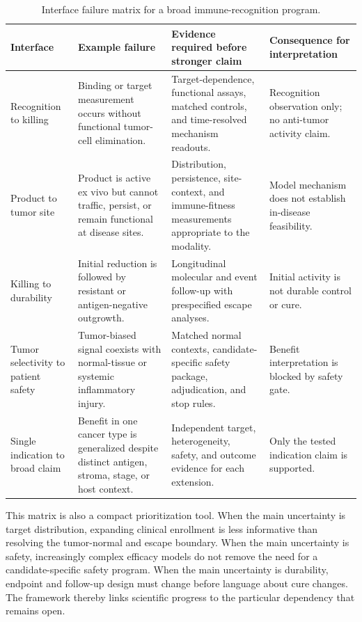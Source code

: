 \documentclass[10pt,conference]{IEEEtran}
\begin{document}
\begin{table}[!t]\caption{Interface failure matrix for a broad immune-recognition program.}\label{tab:interfaces}\centering\footnotesize
\begin{tabular}{@{}p{}p{}p{}p{}@{}}\toprule
Interface & Example failure & Evidence required before stronger claim & Consequence for interpretation\\\midrule
Recognition to killing & Binding or target measurement occurs without functional tumor-cell elimination. & Target-dependence, functional assays, matched controls, and time-resolved mechanism readouts. & Recognition observation only; no anti-tumor activity claim.\\
Product to tumor site & Product is active ex vivo but cannot traffic, persist, or remain functional at disease sites. & Distribution, persistence, site-context, and immune-fitness measurements appropriate to the modality. & Model mechanism does not establish in-disease feasibility.\\
Killing to durability & Initial reduction is followed by resistant or antigen-negative outgrowth. & Longitudinal molecular and event follow-up with prespecified escape analyses. & Initial activity is not durable control or cure.\\
Tumor selectivity to patient safety & Tumor-biased signal coexists with normal-tissue or systemic inflammatory injury. & Matched normal contexts, candidate-specific safety package, adjudication, and stop rules. & Benefit interpretation is blocked by safety gate.\\
Single indication to broad claim & Benefit in one cancer type is generalized despite distinct antigen, stroma, stage, or host context. & Independent target, heterogeneity, safety, and outcome evidence for each extension. & Only the tested indication claim is supported.\\\bottomrule\end{tabular}\end{table}

This matrix is also a compact prioritization tool. When the main uncertainty is target distribution, expanding clinical enrollment is less informative than resolving the tumor-normal and escape boundary. When the main uncertainty is safety, increasingly complex efficacy models do not remove the need for a candidate-specific safety program. When the main uncertainty is durability, endpoint and follow-up design must change before language about cure changes. The framework thereby links scientific progress to the particular dependency that remains open.
\end{document}

